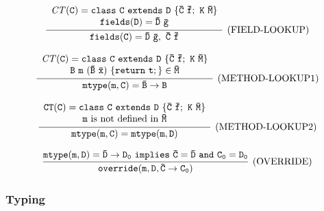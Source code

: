 \documentclass[letterpaper]{article}
\begin{document}
\[
  \begin{array}{c}
    \infer[\text{(FIELD-LOOKUP)}]
    {\tt fields(C)=\bar{D}\ \bar{g},~ \bar{C}\ \bar{f}}
    {\begin{array}{c}
      \tt \mathit{CT}(C)=class\ C\ extends\ D\ \{\bar{C}\ \bar{f};\ K\ \bar{M}\} \\
      \tt fields(D)=\bar{D}\ \bar{g}
      \end{array}
    }
  \end{array}
\]

\[
  \begin{array}{c}
    \infer[\text{(METHOD-LOOKUP1)}]
    {\tt mtype(m,C)=\bar{B}\rightarrow B}
    {
      \begin{array}{c}
        \tt \mathit{CT}(C)=class\ C\ extends\ D\ \{\bar{C}\ \bar{f};\ K\ \bar{M}\}\\
        \tt B\ m\ (\bar{B}\ \bar{x})\ \{return\ t;\} \in \bar{M}
      \end{array}
    }
  \end{array}
\]

\[
  \begin{array}{c}
    \infer[\text{(METHOD-LOOKUP2)}]
    {\tt mtype(m,C)=mtype(m,D)}
    {
      \begin{array}{c}
        \tt CT(C)=class\ C\ extends\ D\ \{\bar{C}\ \bar{f};\ K\ \bar{M}\}\\
        \text{$\tt m$ is not defined in $\tt\bar{M}$}
      \end{array}
    }
  \end{array}
\]

\[
  \begin{array}{c}
    \infer[\text{(OVERRIDE)}]
    {\tt override(m,D,\bar{C}\rightarrow C_0)}
    {\tt mtype(m,D)=\bar{D}\rightarrow D_0\ implies\ \bar{C}=\bar{D}\ and\ C_0=D_0}
  \end{array}
\]
\subsubsection{Typing}
\begin{center}
\DP
\end{center}
\vspace{3pt}

\begin{center}
\DP
\end{center}
\vspace{3pt}
\end{document}
